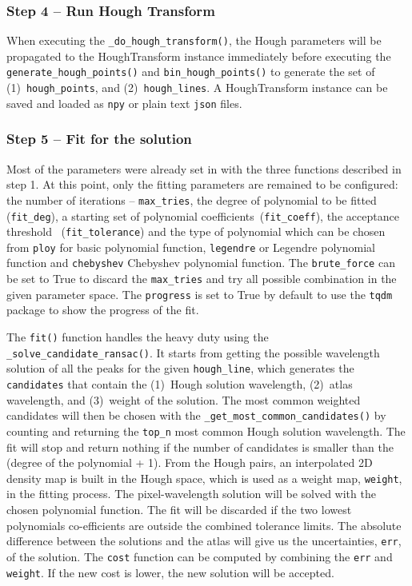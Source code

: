 \documentclass{aa}
\begin{document}
\subsubsection*{Step 4 -- Run Hough Transform}
When executing the \texttt{\_do\_hough\_transform()}, the Hough parameters
will be propagated to the HoughTransform instance immediately before
executing the \texttt{generate\_hough\_points()} and
\texttt{bin\_hough\_points()} to generate the set of 
(1)~\texttt{hough\_points}, and (2)~\texttt{hough\_lines}. A HoughTransform
instance can be saved and loaded as \texttt{npy} or plain text \texttt{json}
files.

\subsubsection*{Step 5 -- Fit for the solution}
Most of the parameters were already set in with the three functions described
in step 1. At this point, only the fitting parameters are remained to be
configured: the number of iterations -- \texttt{max\_tries}, the degree of
polynomial to be fitted (\texttt{fit\_deg}), a starting set of polynomial
coefficients~(\texttt{fit\_coeff}), the acceptance threshold~
(\texttt{fit\_tolerance}) and the type of polynomial which can be chosen
from \texttt{ploy} for basic polynomial function, \texttt{legendre} or Legendre
polynomial function and \texttt{chebyshev} Chebyshev polynomial function. The
\texttt{brute\_force} can be set to True to discard the \texttt{max\_tries}
and try all possible combination in the given parameter space. The
\texttt{progress} is set to True by default to use the \texttt{tqdm} package
to show the progress of the fit.

The \texttt{fit()} function handles the heavy duty using the
\texttt{\_solve\_candidate\_ransac()}. It starts from getting the possible
wavelength solution of all the peaks for the given \texttt{hough\_line}, which
generates the \texttt{candidates} that contain the (1)~Hough solution wavelength,
(2)~atlas wavelength, and (3)~weight of the solution. The most common weighted
candidates will then be chosen with the \texttt{\_get\_most\_common\_candidates()}
by counting and returning the \texttt{top\_n} most common Hough solution wavelength.
The fit will stop and return nothing if the number of candidates is smaller than
the (degree of the polynomial + 1). From the Hough pairs, an interpolated 2D
density map is built in the Hough space, which is used as a weight map,
\texttt{weight}, in the fitting process. The pixel-wavelength solution will be
solved with the chosen polynomial function. The fit will be discarded if the two
lowest polynomials co-efficients are outside the combined tolerance limits. The
absolute difference between the solutions and the atlas will give us the
uncertainties, \texttt{err}, of the solution. The \texttt{cost} function can
be computed by combining the \texttt{err} and \texttt{weight}. If the new cost
is lower, the new solution will be accepted.
\end{document}
